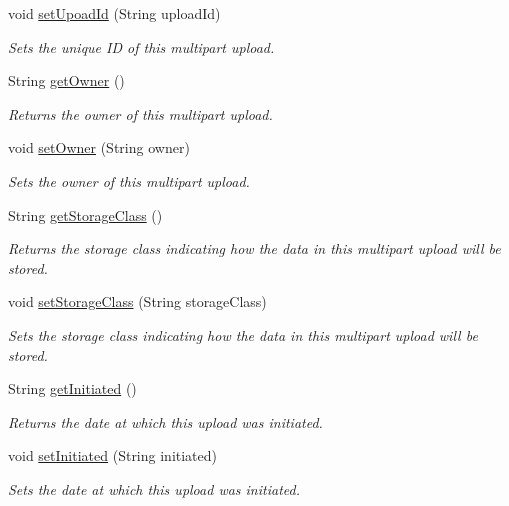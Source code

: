 \begin{DoxyCompactItemize}
void \hyperlink{classorg_1_1jcs_1_1dss_1_1main_1_1MultipartUpload_afb810ac033b09a673ff519227b2e8a6b}{set\+Upoad\+Id} (String upload\+Id)
\begin{DoxyCompactList}\small\item\em Sets the unique ID of this multipart upload. \end{DoxyCompactList}\item 
String \hyperlink{classorg_1_1jcs_1_1dss_1_1main_1_1MultipartUpload_a2868274515c60e4dcb4faef2f34cbba0}{get\+Owner} ()
\begin{DoxyCompactList}\small\item\em Returns the owner of this multipart upload. \end{DoxyCompactList}\item 
void \hyperlink{classorg_1_1jcs_1_1dss_1_1main_1_1MultipartUpload_a50040f60417bdd633d0f4eed5cc9befe}{set\+Owner} (String owner)
\begin{DoxyCompactList}\small\item\em Sets the owner of this multipart upload. \end{DoxyCompactList}\item 
String \hyperlink{classorg_1_1jcs_1_1dss_1_1main_1_1MultipartUpload_a921148fb8b444951420695c21b2c71bf}{get\+Storage\+Class} ()
\begin{DoxyCompactList}\small\item\em Returns the storage class indicating how the data in this multipart upload will be stored. \end{DoxyCompactList}\item 
void \hyperlink{classorg_1_1jcs_1_1dss_1_1main_1_1MultipartUpload_a3d57d257bcdfcc3e7a2d81efdcb31a70}{set\+Storage\+Class} (String storage\+Class)
\begin{DoxyCompactList}\small\item\em Sets the storage class indicating how the data in this multipart upload will be stored. \end{DoxyCompactList}\item 
String \hyperlink{classorg_1_1jcs_1_1dss_1_1main_1_1MultipartUpload_a64ec8d812dbe2768e87123e1be56d251}{get\+Initiated} ()
\begin{DoxyCompactList}\small\item\em Returns the date at which this upload was initiated. \end{DoxyCompactList}\item 
void \hyperlink{classorg_1_1jcs_1_1dss_1_1main_1_1MultipartUpload_aec9d245c1649a8cdaacc4f671e410961}{set\+Initiated} (String initiated)
\begin{DoxyCompactList}\small\item\em Sets the date at which this upload was initiated. \end{DoxyCompactList}\end{DoxyCompactItemize}


